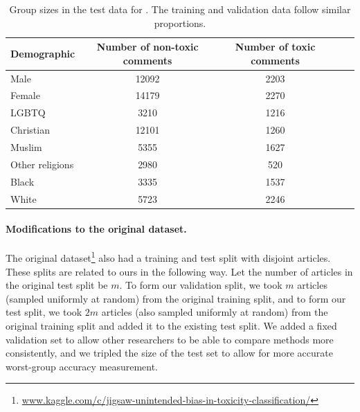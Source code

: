 \begin{table}[!t]
  \caption{Group sizes in the test data for \CivilComments. The training and validation data follow similar proportions.}
  \label{tab:groupsizes_civilcomments}
  \centering
  \begin{tabular}{lcccc}
  \toprule
  Demographic & Number of non-toxic comments & Number of toxic comments \\
  \midrule
  Male                &   12092 &   2203 \\
  Female              &   14179 &   2270 \\
  LGBTQ               &    3210 &   1216 \\
  Christian           &   12101 &   1260 \\
  Muslim              &    5355 &   1627 \\
  Other religions     &    2980 &    520 \\
  Black               &    3335 &   1537 \\
  White               &    5723 &   2246 \\
  \bottomrule
  \end{tabular}
\end{table}


\paragraph{Modifications to the original dataset.}
The original dataset\footnote{\url{www.kaggle.com/c/jigsaw-unintended-bias-in-toxicity-classification/}} also had a training and test split with disjoint articles. These splits are related to ours in the following way. Let the number of articles in the original test split be $m$. To form our validation split, we took $m$ articles (sampled uniformly at random) from the original training split, and to form our test split, we took $2m$ articles (also sampled uniformly at random) from the original training split and added it to the existing test split.
We added a fixed validation set to allow other researchers to be able to compare methods more consistently, and we tripled the size of the test set to allow for more accurate worst-group accuracy measurement.

